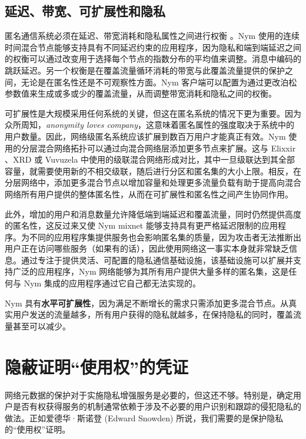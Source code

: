 \documentclass{article}
\begin{document}
	\subsection{延迟、带宽、可扩展性和隐私}

	匿名通信系统必须在延迟、带宽消耗和隐私属性之间进行权衡 \cite{ref33}。Nym 使用的连续时间混合节点能够支持具有不同延迟约束的应用程序，因为隐私和端到端延迟之间的权衡可以通过改变用于选择每个节点的指数分布的平均值来调整。消息中编码的跳跃延迟。另一个权衡是在覆盖流量循环消耗的带宽与此覆盖流量提供的保护之间，无论是在匿名性还是不可观察性方面。Nym 客户端可以配置为通过更改泊松参数值来生成或多或少的覆盖流量，从而调整带宽消耗和隐私之间的权衡。\newline

	可扩展性是大规模采用任何系统的关键，但这在匿名系统的情况下更为重要。因为众所周知，\emph{anonymity loves company}\cite{ref41}，这意味着匿名属性的强度取决于系统中的用户数量。因此，网络级匿名系统应该扩展到数百万用户才能真正有效。Nym 使用的分层混合网络拓扑可以通过向混合网络层添加更多节点来扩展。这与 Elixxir \cite{ref16, ref19}、XRD\cite{ref70} 或 Vuvuzela \cite{ref103} 中使用的级联混合网络形成对比，其中一旦级联达到其全部容量，就需要使用新的不相交级联，随后进行分区和匿名集的大小上限。相反，在分层网络中，添加更多混合节点以增加容量和处理更多流量负载有助于提高向混合网络所有用户提供的整体匿名性，从而在可扩展性和匿名性之间产生协同作用。\newline

	此外，增加的用户和消息数量允许降低端到端延迟和覆盖流量，同时仍然提供高度的匿名性，这反过来又使 Nym mixnet 能够支持具有更严格延迟限制的应用程序。为不同的应用程序集提供服务也会影响匿名集的质量，因为攻击者无法推断出用户正在访问哪些服务（如果有的话），因此使用网络这一事实本身就非常缺乏信息。通过专注于提供灵活、可配置的隐私通信基础设施，该基础设施可以扩展并支持广泛的应用程序，Nym 网络能够为其所有用户提供大量多样的匿名集，这是任何与 Nym 集成的应用程序通过它自己都无法实现的。\newline

	Nym 具有\textbf{水平可扩展性}，因为满足不断增长的需求只需添加更多混合节点。从真实用户发送的流量越多，所有用户获得的隐私就越多，在保持隐私的同时，覆盖流量甚至可以减少。\newline
	
	\section{隐蔽证明“使用权”的凭证}

	网络元数据的保护对于实施隐私增强服务是必要的，但这还不够。特别是，确定用户是否有权获得服务的机制通常依赖于涉及不必要的用户识别和跟踪的侵犯隐私的做法。正如爱德华·斯诺登 (Edward Snowden) 所说，我们需要的是保护隐私的“使用权”证明。
	
\end{document}
